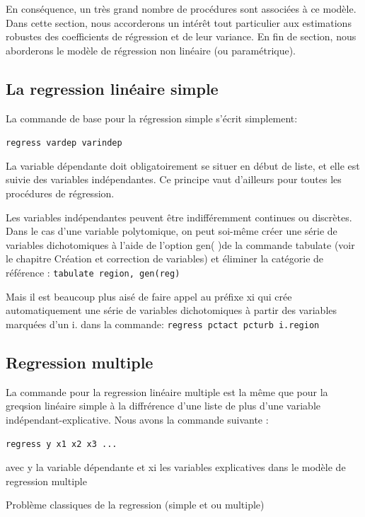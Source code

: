 \documentclass[
]{book}
\begin{document}
En conséquence, un très grand nombre de procédures sont
associées à ce modèle. Dans cette section, nous accorderons un
intérêt tout particulier aux estimations robustes des coefficients
de régression et de leur variance. En fin de section, nous
aborderons le modèle de régression non linéaire (ou
paramétrique).

\hypertarget{la-regression-linuxe9aire-simple}{%
\subsection{La regression linéaire simple}\label{la-regression-linuxe9aire-simple}}

La commande de base pour la régression simple s'écrit
simplement:

\texttt{regress\ vardep\ varindep}

La variable dépendante doit obligatoirement se situer en début
de liste, et elle est suivie des variables indépendantes. Ce
principe vaut d'ailleurs pour toutes les procédures de régression.

Les variables indépendantes peuvent être indifféremment
continues ou discrètes. Dans le cas d'une variable polytomique,
on peut soi-même créer une série de variables dichotomiques à
l'aide de l'option gen( )de la commande tabulate (voir le
chapitre Création et correction de variables) et éliminer la
catégorie de référence :
\texttt{tabulate\ region,\ gen(reg)}

Mais il est beaucoup plus aisé de faire appel au préfixe xi qui
crée automatiquement une série de variables dichotomiques à
partir des variables marquées d'un i. dans la commande:
\texttt{regress\ pctact\ pcturb\ i.region}

\hypertarget{regression-multiple}{%
\subsection{Regression multiple}\label{regression-multiple}}

La commande pour la regression linéaire multiple est la même que pour la greqsion linéaire simple à la diffrérence d'une liste de plus d'une variable indépendant-explicative. Nous avons la commande suivante :

\texttt{regress\ y\ x1\ x2\ x3\ ...}

avec y la variable dépendante et xi les variables explicatives dans le modèle de regression multiple

Problème classiques de la regression (simple et ou multiple)
\end{document}
